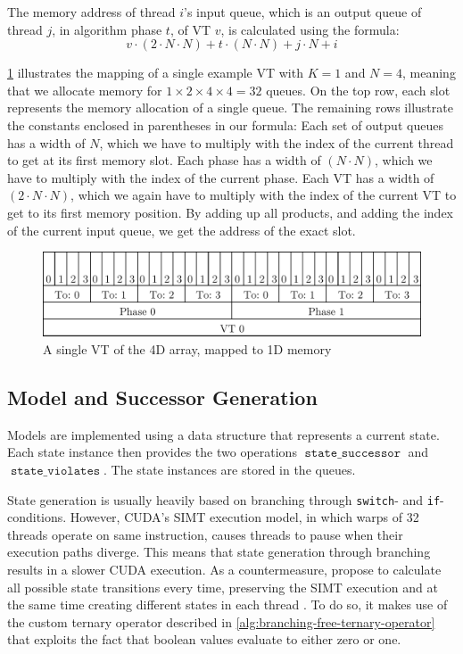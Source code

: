 \documentclass[
fancyheadings, %
%
%
]{stsreprt}
\DeclareMathOperator{\sSuccessor}{\texttt{state\_successor}}
\DeclareMathOperator{\sViolates}{\texttt{state\_violates}}
\begin{document}
The memory address of thread $i$'s input queue, which is an output queue of thread $j$, in algorithm phase $t$, of VT $v$, is calculated using the formula:
\[v \cdot (2 \cdot N \cdot N) + t \cdot (N \cdot N) + j \cdot N + i\]

\cref{fig:4d-mapped-memory} illustrates the mapping of a single example VT with $K=1$ and $N=4$, meaning that we allocate memory for $1 \times 2 \times 4 \times 4 = 32$ queues.
On the top row, each slot represents the memory allocation of a single queue.
The remaining rows illustrate the constants enclosed in parentheses in our formula:
Each set of output queues has a width of $N$, which we have to multiply with the index of the current thread to get at its first memory slot.
Each phase has a width of $(N \cdot N)$, which we have to multiply with the index of the current phase.
Each VT has a width of $(2 \cdot N \cdot N)$, which we again have to multiply with the index of the current VT to get to its first memory position.
By adding up all products, and adding the index of the current input queue, we get the address of the exact slot.

\begin{figure}[h]
    \includegraphics[width=\textwidth]{figures/4d-mapped-memory}
    \caption{A single VT of the 4D array, mapped to 1D memory}
    \label{fig:4d-mapped-memory}
\end{figure}

\subsection{Model and Successor Generation}

Models are implemented using a data structure that represents a current state.
Each state instance then provides the two operations $\sSuccessor$ and $\sViolates$.
The state instances are stored in the queues.

State generation is usually heavily based on branching through \texttt{switch}- and \texttt{if}-conditions.
However, CUDA's SIMT execution model, in which warps of 32 threads operate on same instruction, causes threads to pause when their execution paths diverge.
This means that state generation through branching results in a slower CUDA execution.
As a countermeasure, \citeauthor*{Bartocci2014.GPGPU-Parallel-SPIN} propose to calculate all possible state transitions every time, preserving the SIMT execution and at the same time creating different states in each thread \cite[Algorithm 3]{Bartocci2014.GPGPU-Parallel-SPIN}.
To do so, it makes use of the custom ternary operator described in \cref{alg:branching-free-ternary-operator} that exploits the fact that boolean values evaluate to either zero or one.
\end{document}
